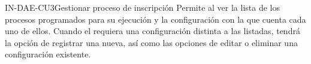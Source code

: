 \begin{UseCase}{IN-DAE-CU3}{Gestionar proceso de inscripción}{
	Permite al  ver la lista de los procesos programados para su ejecución y la configuración con la que cuenta cada uno de ellos. Cuando el  requiera una configuración distinta a las listadas, tendrá la opción de registrar una nueva, así como las opciones de editar o eliminar una configuración existente.		
	} 
	

\end{UseCase}
